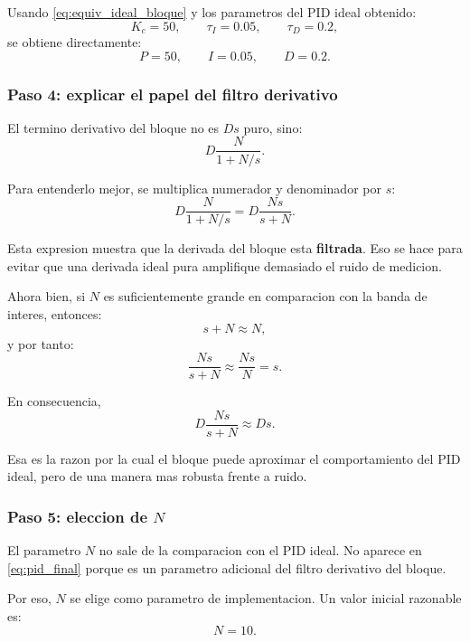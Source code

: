 \documentclass[11pt]{article}
\begin{document}
Usando \eqref{eq:equiv_ideal_bloque} y los parametros del PID ideal obtenido:
\[
K_c=50,\qquad \tau_I=0.05,\qquad \tau_D=0.2,
\]
se obtiene directamente:
\begin{equation}
P=50,
\qquad
I=0.05,
\qquad
D=0.2.
\label{eq:PID_directos}
\end{equation}

\subsubsection{Paso 4: explicar el papel del filtro derivativo}

El termino derivativo del bloque no es $Ds$ puro, sino:
\begin{equation}
D\frac{N}{1+N/s}.
\label{eq:term_deriv_block}
\end{equation}

Para entenderlo mejor, se multiplica numerador y denominador por $s$:
\begin{equation}
D\frac{N}{1+N/s}
=
D\frac{Ns}{s+N}.
\label{eq:term_deriv_block_2}
\end{equation}

Esta expresion muestra que la derivada del bloque esta \textbf{filtrada}. Eso se hace para evitar que una derivada ideal pura amplifique demasiado el ruido de medicion.

Ahora bien, si $N$ es suficientemente grande en comparacion con la banda de interes, entonces:
\[
s+N \approx N,
\]
y por tanto:
\begin{equation}
\frac{Ns}{s+N}\approx \frac{Ns}{N}=s.
\end{equation}

En consecuencia,
\begin{equation}
D\frac{Ns}{s+N}\approx Ds.
\end{equation}

Esa es la razon por la cual el bloque puede aproximar el comportamiento del PID ideal, pero de una manera mas robusta frente a ruido.

\subsubsection{Paso 5: eleccion de $N$}

El parametro $N$ no sale de la comparacion con el PID ideal. No aparece en \eqref{eq:pid_final} porque es un parametro adicional del filtro derivativo del bloque.

Por eso, $N$ se elige como parametro de implementacion. Un valor inicial razonable es:
\[
N=10.
\]
\end{document}
